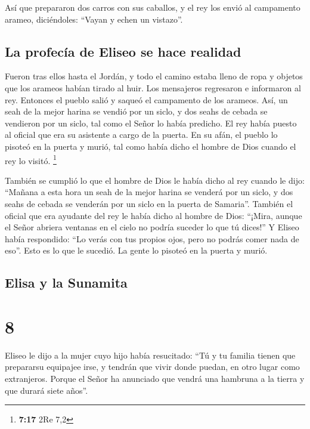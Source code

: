  Así que prepararon dos carros con sus caballos, y el rey
los envió al campamento arameo, diciéndoles: ``Vayan y echen un
vistazo''.

\hypertarget{la-profecuxeda-de-eliseo-se-hace-realidad}{%
\subsection{La profecía de Eliseo se hace
realidad}\label{la-profecuxeda-de-eliseo-se-hace-realidad}}

 Fueron tras ellos hasta el Jordán, y todo el camino
estaba lleno de ropa y objetos que los arameos habían tirado al huir.
Los mensajeros regresaron e informaron al rey.  Entonces
el pueblo salió y saqueó el campamento de los arameos. Así, un seah de
la mejor harina se vendió por un siclo, y dos seahs de cebada se
vendieron por un siclo, tal como el Señor lo había predicho.
 El rey había puesto al oficial que era su asistente a
cargo de la puerta. En su afán, el pueblo lo pisoteó en la puerta y
murió, tal como había dicho el hombre de Dios cuando el rey lo visitó.
\footnote{\textbf{7:17} 2Re 7,2}

 También se cumplió lo que el hombre de Dios le había
dicho al rey cuando le dijo: ``Mañana a esta hora un seah de la mejor
harina se venderá por un siclo, y dos seahs de cebada se venderán por un
siclo en la puerta de Samaria''.  También el oficial que
era ayudante del rey le había dicho al hombre de Dios: ``¡Mira, aunque
el Señor abriera ventanas en el cielo no podría suceder lo que tú
dices!'' Y Eliseo había respondido: ``Lo verás con tus propios ojos,
pero no podrás comer nada de eso''.  Esto es lo que le
sucedió. La gente lo pisoteó en la puerta y murió.

\hypertarget{elisa-y-la-sunamita}{%
\subsection{Elisa y la Sunamita}\label{elisa-y-la-sunamita}}

\hypertarget{section-7}{%
\section{8}\label{section-7}}

 Eliseo le dijo a la mujer cuyo hijo había resucitado:
``Tú y tu familia tienen que prepararsu equipajee irse, y tendrán que
vivir donde puedan, en otro lugar como extranjeros. Porque el Señor ha
anunciado que vendrá una hambruna a la tierra y que durará siete años''.

